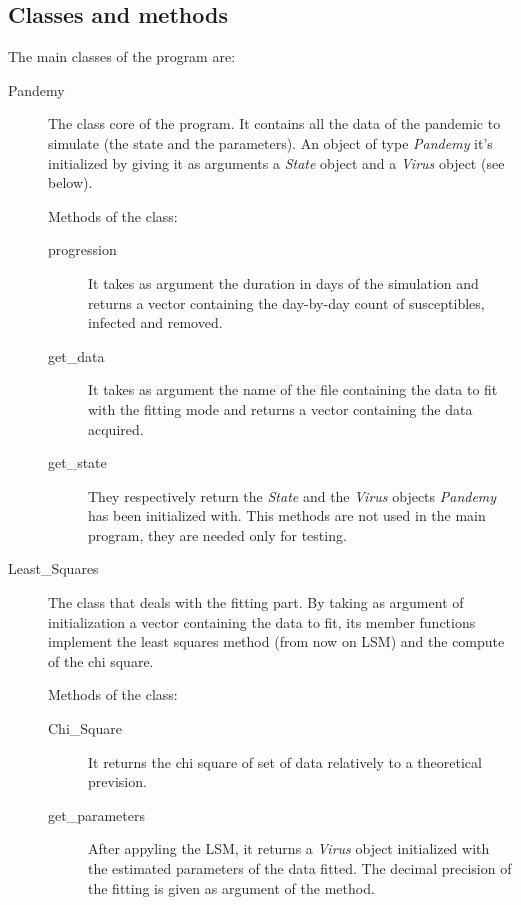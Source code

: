 \subsection{Classes and methods}

The main classes of the program are:
\begin{description}
\item[Pandemy] The class core of the program. It contains all the data of the pandemic to simulate (the state and the parameters). An object of type \emph{Pandemy} it's initialized by giving it as arguments a \emph{State} object and a \emph{Virus} object (see below).

Methods of the class:
\begin{description}
\item[progression] It takes as argument the duration in days of the simulation and returns a vector containing the day-by-day count of susceptibles, infected and removed.
\item[get\_data] It takes as argument the name of the file containing the data to fit with the fitting mode and returns a vector containing the data acquired.
\item[get\_state \and get\_virus] They respectively return the \emph{State} and the \emph{Virus} objects \emph{Pandemy} has been initialized with. This methods are not used in the main program, they are needed only for testing.
\end{description}

\item[Least\_Squares] The class that deals with the fitting part. By taking as argument of initialization a vector containing the data to fit, its member functions implement the least squares method (from now on LSM) and the compute of the chi square.

Methods of the class:
\begin{description}
\item[Chi\_Square] It returns the chi square of set of data relatively to a theoretical prevision.
\item[get\_parameters] After appyling the LSM, it returns a \emph{Virus} object initialized with the estimated parameters of the data fitted. The decimal precision of the fitting is given as argument of the method.
\end{description}

\end{description}

